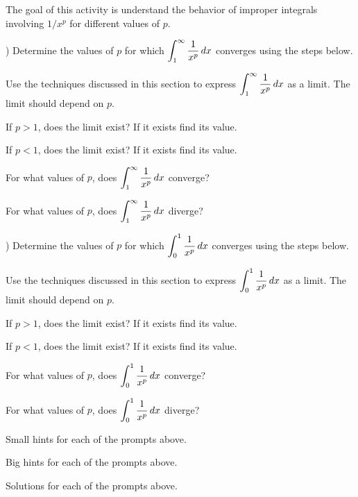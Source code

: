 \begin{activity} \label{A:5.5.4}  The goal of this activity is understand the behavior of improper integrals involving $1/x^p$ for different values of $p$. 

)  Determine the values of $p$ for which $\displaystyle \int_1^{\infty} \frac{1}{x^p} \, dx$ converges using the steps below.

\ba
\item Use the techniques discussed in this section to express  $\displaystyle \int_1^{\infty} \frac{1}{x^p} \, dx$ as a limit. The limit should depend on $p$.
\item If $p>1$, does the limit exist? If it exists find its value.
\item If $p<1$, does the limit exist? If it exists find its value.
\item For what values of $p$, does $\displaystyle \int_1^{\infty} \frac{1}{x^p} \, dx$ converge?
\item For what values of $p$, does $\displaystyle \int_1^{\infty} \frac{1}{x^p} \, dx$ diverge?
\ea

) Determine the values of $p$ for which $\displaystyle \int_0^1 \frac{1}{x^p} \, dx$ converges using the steps below.
\ba
\item Use the techniques discussed in this section to express  $\displaystyle \int_0^1 \frac{1}{x^p} \, dx$ as a limit. The limit should depend on $p$.
\item If $p>1$, does the limit exist? If it exists find its value.
\item If $p<1$, does the limit exist? If it exists find its value.
\item For what values of $p$, does $\displaystyle \int_0^1 \frac{1}{x^p} \, dx$ converge?
\item For what values of $p$, does $\displaystyle \int_0^1 \frac{1}{x^p} \, dx$ diverge?
\ea


\end{activity}
\begin{smallhint}
\ba
	\item Small hints for each of the prompts above.
\ea
\end{smallhint}
\begin{bighint}
\ba
	\item Big hints for each of the prompts above.
\ea
\end{bighint}
\begin{activitySolution}
\ba
	\item Solutions for each of the prompts above.
\ea
\end{activitySolution}
\aftera